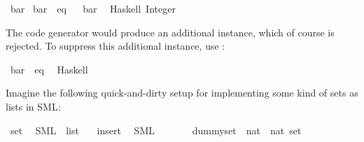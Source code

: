 \begin{isabellebody}
\begin{isamarkuptext}
\end{isamarkuptext}%
\isamarkuptrue%
\isamarkupfalse%
\ bar\isanewline
\isanewline
{}\isamarkupfalse%
\ bar\ {\isacharcolon}{\isacharcolon}\ eq%
\isadelimproof
\ %
\endisadelimproof
%
\isatagproof
\isacommand{{\isachardot}{\isachardot}}\isamarkupfalse%
%
\endisatagproof
{\isafoldproof}%
%
\isadelimproof
%
\endisadelimproof
\isanewline
%
\isadelimtt
\isanewline
%
\endisadelimtt
%
\isatagtt
{}\isamarkupfalse%
\ bar\isanewline
\ \ {\isacharparenleft}Haskell\ {\isachardoublequoteopen}Integer{\isachardoublequoteclose}{\isacharparenright}%
\endisatagtt
{\isafoldtt}%
%
\isadelimtt
%
\endisadelimtt
%
\begin{isamarkuptext}%
The code generator would produce
    an additional instance, which of course is rejected.
    To suppress this additional instance, use
    \isa{{\isasymCODEINSTANCE}}:%
\end{isamarkuptext}%
\isamarkuptrue%
%
\isadelimtt
%
\endisadelimtt
%
\isatagtt
{}\isamarkupfalse%
\ bar\ {\isacharcolon}{\isacharcolon}\ eq\isanewline
\ \ {\isacharparenleft}Haskell\ {\isacharminus}{\isacharparenright}%
\endisatagtt
{\isafoldtt}%
%
\isadelimtt
%
\endisadelimtt
%
\isamarkuptrue%
%
\begin{isamarkuptext}%
Imagine the following quick-and-dirty setup for implementing
  some kind of sets as lists in SML:%
\end{isamarkuptext}%
\isamarkuptrue%
%
\isadelimtt
%
\endisadelimtt
%
\isatagtt
{}\isamarkupfalse%
\ set\isanewline
\ \ {\isacharparenleft}SML\ {\isachardoublequoteopen}{\isacharunderscore}\ list{\isachardoublequoteclose}{\isacharparenright}\isanewline
\isanewline
{}\isamarkupfalse%
\ {\isachardoublequoteopen}{\isacharbraceleft}{\isacharbraceright}{\isachardoublequoteclose}\ \ insert\isanewline
\ \ {\isacharparenleft}SML\ {\isachardoublequoteopen}{\isacharbang}{\isacharbrackleft}{\isacharbrackright}{\isachardoublequoteclose}\ \ \ {}\ {\isachardoublequoteopen}{\isacharcolon}{\isacharcolon}{\isachardoublequoteclose}{\isacharparenright}%
\endisatagtt
{\isafoldtt}%
%
\isadelimtt
%
\endisadelimtt
\isanewline
\isanewline
{}\isamarkupfalse%
\isanewline
\ \ dummy{\isacharunderscore}set\ {\isacharcolon}{\isacharcolon}\ {\isachardoublequoteopen}{\isacharparenleft}nat\ {\isasymRightarrow}\ nat{\isacharparenright}\ set{\isachardoublequoteclose}\ \isanewline

\end{isabellebody}

